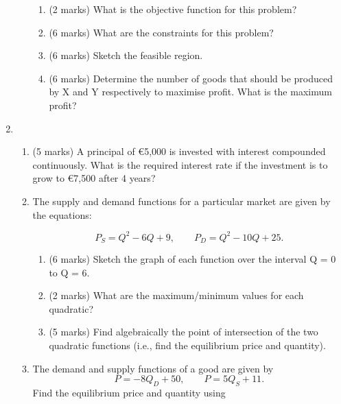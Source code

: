 \documentclass[a4paper,12pt]{article}
\begin{document}
\begin{enumerate}
\begin{enumerate}
\begin{enumerate}
\item (2 marks) What is the objective function for this problem?

\item (6 marks) What are the constraints for this problem?

\item (6 marks) Sketch the feasible region.

\item (6 marks) Determine the number of goods  that should be
produced by X and Y respectively to maximise profit. What is the maximum profit?
\end{enumerate}
\end{enumerate}

\item

\begin{enumerate}
\item (5 marks) A principal of \euro 5,000 is invested with interest
compounded continuously. What is the required interest rate if the
investment is to grow to \euro 7,500 after 4 years?




\item The supply and demand functions for a particular market are given by the equations:

\begin{equation*}
P_{S}=Q^{2}-6Q+9,\qquad P_{D}=Q^{2}-10Q+25.
\end{equation*}


\begin{enumerate}
\item (6 marks) Sketch the graph of each function over the interval Q = 0 to Q = 6.

\item (2 marks) What are the maximum/minimum values for each quadratic?

\item (5 marks) Find algebraically the point of intersection of the two quadratic functions (i.e., find
the equilibrium price and quantity).

\end{enumerate}





\item The demand and supply functions of a good are given by%
\begin{equation*}
P=-8Q_{D}+50,\qquad P=5Q_{S}+11.
\end{equation*}%
Find the equilibrium price and quantity using


\end{enumerate}
\end{enumerate}
\end{document}
